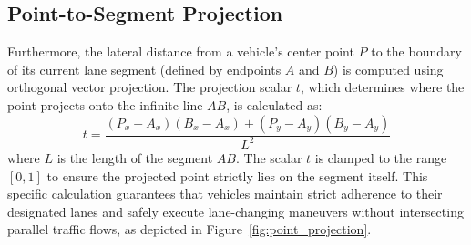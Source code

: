 \documentclass[../report_main.tex]{subfiles}
\begin{document}
\subsection{Point-to-Segment Projection}
Furthermore, the lateral distance from a vehicle's center point $P$ to the boundary of its current lane segment (defined by endpoints $A$ and $B$) is computed using orthogonal vector projection. The projection scalar $t$, which determines where the point projects onto the infinite line $AB$, is calculated as:
\begin{equation}
    t = \frac{(P_x - A_x)(B_x - A_x) + (P_y - A_y)(B_y - A_y)}{L^2}
\end{equation}
where $L$ is the length of the segment $AB$. The scalar $t$ is clamped to the range $[0, 1]$ to ensure the projected point strictly lies on the segment itself. This specific calculation guarantees that vehicles maintain strict adherence to their designated lanes and safely execute lane-changing maneuvers without intersecting parallel traffic flows, as depicted in Figure~\ref{fig:point_projection}.
\end{document}
